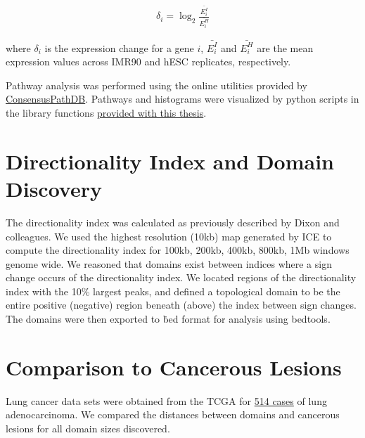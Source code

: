 \begin{align}
  \delta_i = \log_2{\frac{\bar{E_i^I}}{\bar{E_i^H}}}
\end{align}

where $\delta_i$ is the expression change for a gene $i$, $\bar{E_i^I}$ and $\bar{E_i^H}$ are the mean expression values across
IMR90 and hESC replicates, respectively.

Pathway analysis was performed using the online utilities provided by \href{http://consensuspathdb.org/}{ConsensusPathDB}\cite{kamburov2012}.
Pathways and histograms were visualized by python scripts in the library functions
\href{https://github.com/New-College-of-Florida/Jonathan-Niles-Thesis}{provided with this thesis}.

\section*{Directionality Index and Domain Discovery}

The directionality index was calculated as previously described by Dixon and colleagues\cite{dixon2012}.  We used the highest
resolution (10kb) map generated by \gls{ICE} to compute the directionality index for 100kb, 200kb, 400kb, 800kb, 1Mb windows
genome wide.  We reasoned that domains exist between indices where a sign change occurs of the directionality index.  We located
regions of the directionality index with the 10\% largest peaks, and defined a topological domain to be the entire positive (negative)
region beneath (above) the index between sign changes.   The domains were then exported to \.bed format for analysis using
bedtools\cite{quinlan2010,dale2011}.

\section*{Comparison to Cancerous Lesions}

Lung cancer data sets were obtained from the \gls{TCGA} for
\href{https://tcga-data.nci.nih.gov/tcga/tcgaCancerDetails.jsp?diseaseType=LUAD&diseaseName=Lung\%20adenocarcinoma}{514 cases}
of lung adenocarcinoma\cite{cerami2012,gao2013}.  We compared the distances between domains and cancerous lesions for all domain
sizes discovered.
